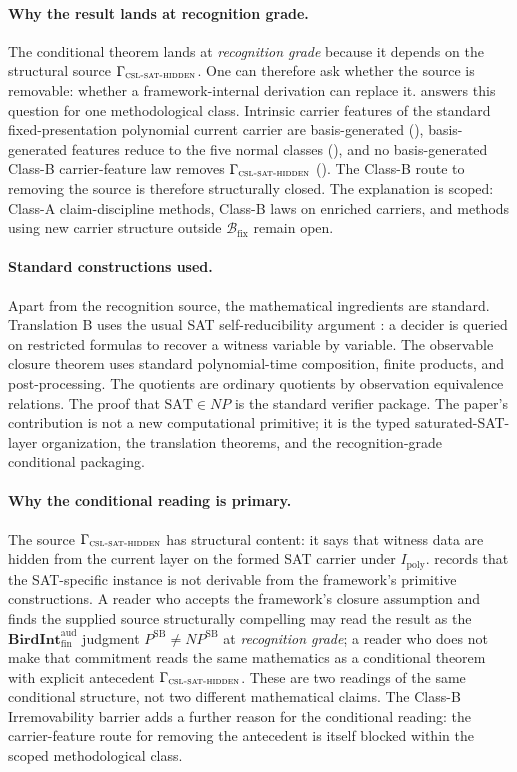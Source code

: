 \documentclass[11pt]{article}
\newcommand{\Ipoly}{I_{\mathrm{poly}}}
\newcommand{\CSLSATHidden}{\Gamma_{\textsc{csl-sat-hidden}}}
\newcommand{\PSB}{P^{\mathrm{SB}}}
\newcommand{\NPSB}{NP^{\mathrm{SB}}}
\newcommand{\BirdInt}{\mathbf{BirdInt}^{\mathrm{aud}}_{\mathrm{fin}}}
\newcommand{\RecognitionGrade}{\emph{recognition grade}}
\theoremstyle{definition}
\begin{document}
\paragraph{Why the result lands at recognition grade.}
The conditional theorem lands at \RecognitionGrade{} because it depends
on the structural source \(\CSLSATHidden\).  One can therefore ask
whether the source is removable: whether a framework-internal
derivation can replace it.   answers this
question for one methodological class.  Intrinsic carrier features of
the standard fixed-presentation polynomial current carrier are
basis-generated (), basis-generated
features reduce to the five normal classes
(), and no basis-generated
Class-B carrier-feature law removes \(\CSLSATHidden\)
().  The Class-B route to removing
the source is therefore structurally closed.  The explanation is
scoped: Class-A claim-discipline methods, Class-B laws on enriched
carriers, and methods using new carrier structure outside
\(\mathcal B_{\mathrm{fix}}\) remain open.

\paragraph{Standard constructions used.}
Apart from the recognition source, the mathematical ingredients are
standard.  Translation B uses the usual SAT self-reducibility argument
\citep{Schoening1986ComplexityStructure,HemaspaandraOgihara2002SelfReducibility}:
a decider is queried on restricted formulas to recover a witness
variable by variable.  The observable closure theorem uses standard
polynomial-time composition, finite products, and post-processing.
The quotients are ordinary quotients by observation equivalence
relations.  The proof that \(\mathrm{SAT}\in NP\) is the standard
verifier package.  The paper's contribution is not a new computational
primitive; it is the typed saturated-SAT-layer organization, the
translation theorems, and the recognition-grade conditional packaging.

\paragraph{Why the conditional reading is primary.}
The source \(\CSLSATHidden\) has structural content: it says that
witness data are hidden from the current layer on the formed SAT
carrier under \(\Ipoly\).  \citet{TsiokosHiddenness2026} records that
the SAT-specific instance is not derivable from the framework's
primitive constructions.  A reader who accepts the framework's closure assumption
and finds the supplied source structurally compelling may read the
result as the \(\BirdInt\) judgment \(\PSB\neq\NPSB\) at
\RecognitionGrade{}; a reader who does not make that commitment reads
the same mathematics as a conditional theorem with explicit antecedent
\(\CSLSATHidden\).  These are two readings of the same conditional
structure, not two different mathematical claims.  The Class-B
Irremovability barrier adds a further reason for the conditional
reading: the carrier-feature route for removing the antecedent is itself
blocked within the scoped methodological class.
\end{document}
